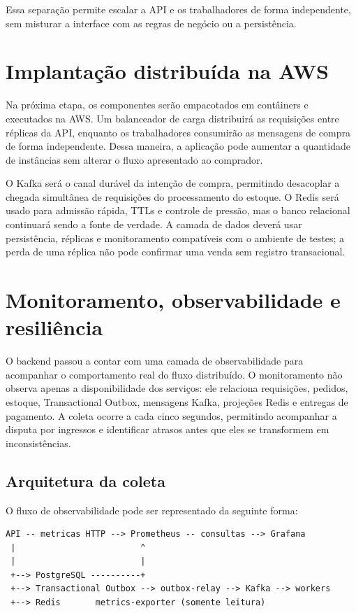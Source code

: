 \documentclass[12pt,a4paper]{article}
\begin{document}
Essa separa\c{c}\~ao permite escalar a API e os trabalhadores de forma independente, sem misturar a interface com as regras de neg\'ocio ou a persist\^encia.

\section{Implanta\c{c}\~ao distribu\'ida na AWS}

Na pr\'oxima etapa, os componentes ser\~ao empacotados em cont\^ainers e executados na AWS. Um balanceador de carga distribuir\'a as requisi\c{c}\~oes entre r\'eplicas da API, enquanto os trabalhadores consumir\~ao as mensagens de compra de forma independente. Dessa maneira, a aplica\c{c}\~ao pode aumentar a quantidade de inst\^ancias sem alterar o fluxo apresentado ao comprador.

O Kafka ser\'a o canal dur\'avel da inten\c{c}\~ao de compra, permitindo desacoplar a chegada simult\^anea de requisi\c{c}\~oes do processamento do estoque. O Redis ser\'a usado para admiss\~ao r\'apida, TTLs e controle de press\~ao, mas o banco relacional continuar\'a sendo a fonte de verdade. A camada de dados dever\'a usar persist\^encia, r\'eplicas e monitoramento compat\'iveis com o ambiente de testes; a perda de uma r\'eplica n\~ao pode confirmar uma venda sem registro transacional.

\section{Monitoramento, observabilidade e resili\^encia}

O backend passou a contar com uma camada de observabilidade para acompanhar o comportamento real do fluxo distribu\'ido. O monitoramento n\~ao observa apenas a disponibilidade dos servi\c{c}os: ele relaciona requisi\c{c}\~oes, pedidos, estoque, Transactional Outbox, mensagens Kafka, proje\c{c}\~oes Redis e entregas de pagamento. A coleta ocorre a cada cinco segundos, permitindo acompanhar a disputa por ingressos e identificar atrasos antes que eles se transformem em inconsist\^encias.

\subsection{Arquitetura da coleta}

O fluxo de observabilidade pode ser representado da seguinte forma:

\begin{lstlisting}
API -- metricas HTTP --> Prometheus -- consultas --> Grafana
 |                         ^
 |                         |
 +--> PostgreSQL ----------+
 +--> Transactional Outbox --> outbox-relay --> Kafka --> workers
 +--> Redis       metrics-exporter (somente leitura)
\end{lstlisting}
\end{document}
